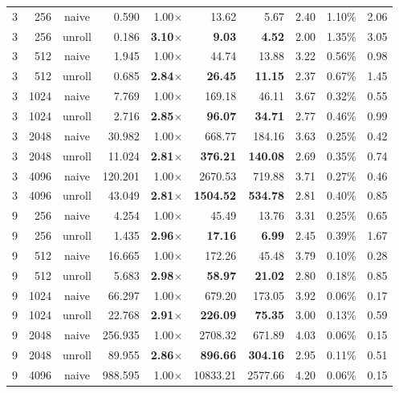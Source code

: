 \documentclass[11pt,a4paper]{article}
\begin{document}
{\begin{longtable}{rrcrrrrrrr}
3 & 256 & naive & 0.590 & 1.00$\times$ & 13.62 & 5.67 & 2.40 & 1.10\% & 2.06 \\
3 & 256 & unroll & 0.186 & \textbf{3.10$\times$} & \textbf{9.03} & \textbf{4.52} & 2.00 & 1.35\% & 3.05 \\
\midrule
3 & 512 & naive & 1.945 & 1.00$\times$ & 44.74 & 13.88 & 3.22 & 0.56\% & 0.98 \\
3 & 512 & unroll & 0.685 & \textbf{2.84$\times$} & \textbf{26.45} & \textbf{11.15} & 2.37 & 0.67\% & 1.45 \\
\midrule
3 & 1024 & naive & 7.769 & 1.00$\times$ & 169.18 & 46.11 & 3.67 & 0.32\% & 0.55 \\
3 & 1024 & unroll & 2.716 & \textbf{2.85$\times$} & \textbf{96.07} & \textbf{34.71} & 2.77 & 0.46\% & 0.99 \\
\midrule
3 & 2048 & naive & 30.982 & 1.00$\times$ & 668.77 & 184.16 & 3.63 & 0.25\% & 0.42 \\
3 & 2048 & unroll & 11.024 & \textbf{2.81$\times$} & \textbf{376.21} & \textbf{140.08} & 2.69 & 0.35\% & 0.74 \\
\midrule
3 & 4096 & naive & 120.201 & 1.00$\times$ & 2670.53 & 719.88 & 3.71 & 0.27\% & 0.46 \\
3 & 4096 & unroll & 43.049 & \textbf{2.81$\times$} & \textbf{1504.52} & \textbf{534.78} & 2.81 & 0.40\% & 0.85 \\
\midrule
9 & 256 & naive & 4.254 & 1.00$\times$ & 45.49 & 13.76 & 3.31 & 0.25\% & 0.65 \\
9 & 256 & unroll & 1.435 & \textbf{2.96$\times$} & \textbf{17.16} & \textbf{6.99} & 2.45 & 0.39\% & 1.67 \\
\midrule
9 & 512 & naive & 16.665 & 1.00$\times$ & 172.26 & 45.48 & 3.79 & 0.10\% & 0.28 \\
9 & 512 & unroll & 5.683 & \textbf{2.98$\times$} & \textbf{58.97} & \textbf{21.02} & 2.80 & 0.18\% & 0.85 \\
\midrule
9 & 1024 & naive & 66.297 & 1.00$\times$ & 679.20 & 173.05 & 3.92 & 0.06\% & 0.17 \\
9 & 1024 & unroll & 22.768 & \textbf{2.91$\times$} & \textbf{226.09} & \textbf{75.35} & 3.00 & 0.13\% & 0.59 \\
\midrule
9 & 2048 & naive & 256.935 & 1.00$\times$ & 2708.32 & 671.89 & 4.03 & 0.06\% & 0.15 \\
9 & 2048 & unroll & 89.955 & \textbf{2.86$\times$} & \textbf{896.66} & \textbf{304.16} & 2.95 & 0.11\% & 0.51 \\
\midrule
9 & 4096 & naive & 988.595 & 1.00$\times$ & 10833.21 & 2577.66 & 4.20 & 0.06\% & 0.15 \\

\end{longtable}}
\end{document}
